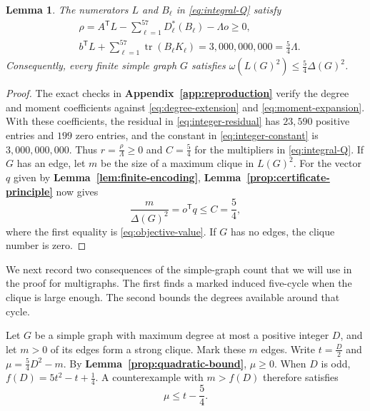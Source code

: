 \documentclass[preprint,11pt,numbers]{elsarticle-arxiv}
\numberwithin{equation}{section}
\newtheorem{lemma}[theorem]{Lemma}
\theoremstyle{definition}
\DeclareMathOperator{\tr}{tr}
\begin{document}
\begin{lemma}\label{prop:checked-certificate}\label{prop:quadratic-bound}\label{lem:rational-witness}
The numerators $L$ and $B_\ell$ in \eqref{eq:integral-Q} satisfy
\begin{align}
 &\rho=A^{\mathsf T}L-\sum_{\ell=1}^{57}D_\ell^*(B_\ell)
                  -\Lambda o\geq0,\label{eq:integer-residual}\\
 &b^{\mathsf T}L+\sum_{\ell=1}^{57}\tr(B_\ell K_\ell)
     =3{,}000{,}000{,}000=\frac{5}{4}\Lambda.
       \label{eq:integer-constant}
\end{align}
Consequently, every finite simple graph $G$ satisfies
$\omega(L(G)^2)\leq\frac{5}{4}\Delta(G)^2$.
\end{lemma}

\begin{proof}
The exact checks in \textbf{Appendix~\ref{app:reproduction}} verify the
degree and moment coefficients against \eqref{eq:degree-extension}
and \eqref{eq:moment-expansion}. With these coefficients, the
residual in \eqref{eq:integer-residual} has $23{,}590$ positive entries
and $199$ zero entries, and the constant in \eqref{eq:integer-constant}
is $3{,}000{,}000{,}000$. Thus $r=\frac{\rho}{\Lambda}\geq0$ and
$C=\frac{5}{4}$ for the multipliers in \eqref{eq:integral-Q}.
If $G$ has an edge, let $m$ be the size of a maximum clique in $L(G)^2$.
For the vector $q$ given by \textbf{Lemma~\ref{lem:finite-encoding}},
\textbf{Lemma~\ref{prop:certificate-principle}} now gives
\[
 \frac{m}{\Delta(G)^2}=o^{\mathsf T}q\leq C=\frac{5}{4},
\]
where the first equality is \eqref{eq:objective-value}.
If $G$ has no edges, the clique number is zero.
\end{proof}

We next record two consequences of the simple-graph count that we will
use in the proof for multigraphs. The first finds a marked induced
five-cycle when the clique is large enough. The second bounds the
degrees available around that cycle.

Let $G$ be a simple graph with maximum degree at most a positive
integer $D$, and let $m>0$ of its edges form a strong clique.
Mark these $m$ edges. Write $t=\frac{D}{2}$ and
$\mu=\frac{5}{4} D^2-m$. By \textbf{Lemma~\ref{prop:quadratic-bound}},
$\mu\geq0$. When $D$ is odd, $f(D)=5t^2-t+\frac{1}{4}$. A counterexample
with $m>f(D)$ therefore satisfies
\begin{equation}\label{eq:odd-counterexample}
 \mu\leq t-\frac{5}{4}.
\end{equation}
\end{document}
